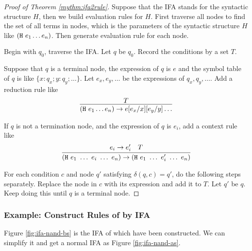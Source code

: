\begin{proof}[Proof of Theorem \ref{mythm:ifa2rule}]

Suppose that the IFA stands for the syntactic structure $H$, then we build evaluation rules for $H$. First traverse all nodes to find the set of all terms in nodes, which is the parameters of the syntactic structure $H$ like $(\mbox{\tt H}~e_1 \ldots e_n)$. Then generate evaluation rule for each node.

Begin with $q_0$, traverse the IFA. Let $q$ be $q_0$. Record the conditions by a set $T$.

Suppose that $q$ is a terminal node, the expression of $q$ is $e$ and the symbol table of $q$ is like $\{x:q_x; y:q_y; \ldots\}$. Let $e_x,e_y,\ldots$ be the expressions of $q_x, q_y, \ldots$. Add a reduction rule like
\[
\infer{(\m{H}~e_1 \ldots e_n) \to e[e_x/x][e_y/y]\ldots}{T}
\]

If $q$ is not a termination node, and the expression of $q$ is $e_i$, add a context rule like
\[
\infer{(\m{H}~e_1~\ldots~e_i~\ldots~e_n) \to (\m{H}~e_1~\ldots~e_i'~\ldots~e_n)}{e_i \to e_i' \quad T}
\]


For each condition $c$ and node $q'$ satisfying $\delta(q, c)=q'$, do the following steps separately. Replace the node in $c$ with its expression and add it to $T$. Let $q'$ be $q$. Keep doing this until $q$ is a terminal node.

\end{proof}

\subsubsection{Example: Construct Rules of  by IFA}

Figure \ref{fig:ifa-nand-bs} is the IFA of  which have been constructed. We can simplify it and get a normal IFA as Figure \ref{fig:ifa-nand-as}.

